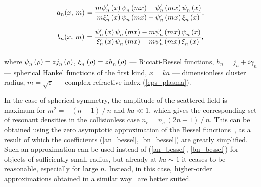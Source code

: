     \begin{equation}
		a_n(x,\:m) = \frac{m {\psi}_{n}^{\prime} \left({x} \right) {\psi}_{n}^{} \left({mx} \right) - {\psi}_{n}^{\prime} \left({mx} \right) {\psi}_{n}^{} \left({x} \right)}{m {\xi}_{n}^{\prime} \left({x} \right) {\psi}_{n}^{} \left({mx} \right) - {\psi}_{n}^{\prime} \left({mx} \right) {\xi}_{n}^{} \left({x} \right)},
		\label{an_bessel}
    \end{equation}

    \begin{equation}
        b_n(x,\:m) = \frac{{\psi}_{n}^{\prime} \left({x} \right) {\psi}_{n}^{} \left({mx} \right) - m {\psi}_{n}^{\prime} \left({mx} \right) {\psi}_{n}^{} \left({x} \right)}{{\xi}_{n}^{\prime} \left({x} \right) {\psi}_{n}^{} \left({mx} \right) - m {\psi}_{n}^{\prime} \left({mx} \right) {\xi}_{n}^{} \left({x} \right)},
        \label{bn_bessel}
    \end{equation}
    \begin{equation*} %
    \end{equation*}

\noindent where ${\psi}_{n}^{} \left({\rho} \right) = z {j}_{n}^{} \left({\rho} \right)$, ${\xi}_{n}^{} \left({\rho} \right) = z {h}_{n}^{} \left({\rho} \right)$ --- Riccati-Bessel functions, $h_n = j_n + i \gamma_n$ --- spherical Hankel functions of the first kind, $x = ka$ --- dimensionless cluster radius, $ m = \sqrt{\varepsilon} $ --- complex refractive index (\ref{eps_plasma}).


In the case of spherical symmetry, the amplitude of the scattered field is maximum for $m^2 = - (n+ 1)\:/\:n$ and $ka \ll 1$, which gives the corresponding set of resonant densities in the collisionless case $n_e = n_c\:( 2n + 1)\:/\:n$. This can be obtained using the zero asymptotic approximation of the Bessel functions~\cite{boren_huffman}, as a result of which the coefficients (\ref{an_bessel}, \ref{bn_bessel}) are greatly simplified. Such an approximation can be used instead of (\ref{an_bessel}, \ref{bn_bessel}) for objects of sufficiently small radius, but already at $ka \sim 1$ it ceases to be reasonable, especially for large $n$. Instead, in this case, higher-order approximations obtained in a similar way~\cite{boren_huffman} are better suited.

